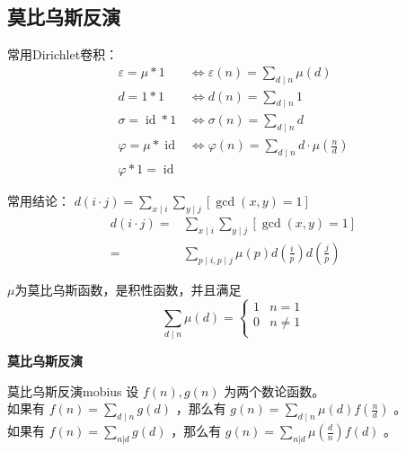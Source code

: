 \subsection{莫比乌斯反演}
常用Dirichlet卷积：
\begin{equation*}
  \begin{aligned}
    \varepsilon=\mu \ast 1&\iff\varepsilon(n)=\sum_{d\mid n}\mu(d)\\
    d=1 \ast 1&\iff d(n)=\sum_{d\mid n}1\\
    \sigma=\operatorname{id} \ast 1&\iff\sigma(n)=\sum_{d\mid n}d\\
    \varphi=\mu \ast \operatorname{id}&\iff\varphi(n)=\sum_{d\mid n}d\cdot\mu(\frac{n}{d})\\
    \varphi \ast 1=\operatorname{id}
    \end{aligned}
\end{equation*}\par
常用结论：
$d(i\cdot j)=\sum_{x \mid i}\sum_{y \mid j}[\gcd(x,y)=1]$
\begin{equation*}
\begin{aligned}
d(i\cdot j)=&\sum_{x \mid i}\sum_{y \mid j}[\gcd(x,y)=1]\\
=&\sum_{p \mid i,p \mid j}\mu(p)d\left(\frac{i}{p}\right)d\left(\frac{j}{p}\right)
\end{aligned}
\end{equation*}\par
$\mu$为莫比乌斯函数，是积性函数，并且满足
\begin{equation*}
  \sum_{d\mid n}\mu(d)=
  \begin{cases}
  1&n=1\\
  0&n\neq 1\\
  \end{cases}
\end{equation*}\par
\textbf{莫比乌斯反演}
\begin{theorem}{莫比乌斯反演}{mobius}
设 $f(n),g(n)$ 为两个数论函数。\\
如果有 $f(n)=\sum_{d\mid n}g(d)$ ，那么有 $g(n)=\sum_{d\mid n}\mu(d)f(\frac{n}{d})$ 。\\
如果有 $f(n)=\sum_{n|d}g(d)$ ，那么有 $g(n)=\sum_{n|d}\mu(\frac{d}{n})f(d)$ 。
\end{theorem}
